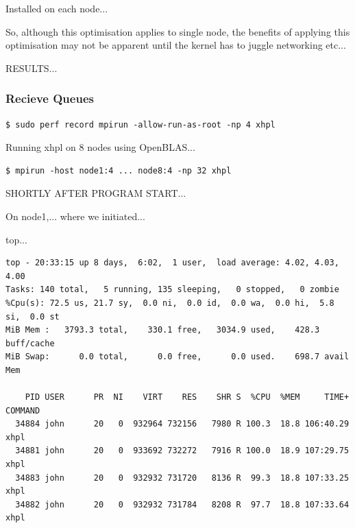 \documentclass{report}
\begin{document}
Installed on each node...

So, although this optimisation applies to  single node, the benefits of applying this optimisation may not be apparent until the kernel has to juggle networking etc...

RESULTS...


%
%
\subsubsection{Recieve Queues}

\lstset{style=termstyle}
\begin{lstlisting}
$ sudo perf record mpirun -allow-run-as-root -np 4 xhpl
\end{lstlisting}



Running xhpl on 8 nodes using OpenBLAS...

\lstset{style=termstyle}
\begin{lstlisting}
$ mpirun -host node1:4 ... node8:4 -np 32 xhpl
\end{lstlisting}


SHORTLY AFTER PROGRAM START...

On node1,... where we initiated...

top...

\lstset{style=termstyle}
\begin{lstlisting}
top - 20:33:15 up 8 days,  6:02,  1 user,  load average: 4.02, 4.03, 4.00
Tasks: 140 total,   5 running, 135 sleeping,   0 stopped,   0 zombie
%Cpu(s): 72.5 us, 21.7 sy,  0.0 ni,  0.0 id,  0.0 wa,  0.0 hi,  5.8 si,  0.0 st
MiB Mem :   3793.3 total,    330.1 free,   3034.9 used,    428.3 buff/cache
MiB Swap:      0.0 total,      0.0 free,      0.0 used.    698.7 avail Mem 

    PID USER      PR  NI    VIRT    RES    SHR S  %CPU  %MEM     TIME+ COMMAND                                                   
  34884 john      20   0  932964 732156   7980 R 100.3  18.8 106:40.29 xhpl                                                      
  34881 john      20   0  933692 732272   7916 R 100.0  18.9 107:29.75 xhpl                                                      
  34883 john      20   0  932932 731720   8136 R  99.3  18.8 107:33.25 xhpl                                                      
  34882 john      20   0  932932 731784   8208 R  97.7  18.8 107:33.64 xhpl                                                      
\end{lstlisting}
\end{document}
